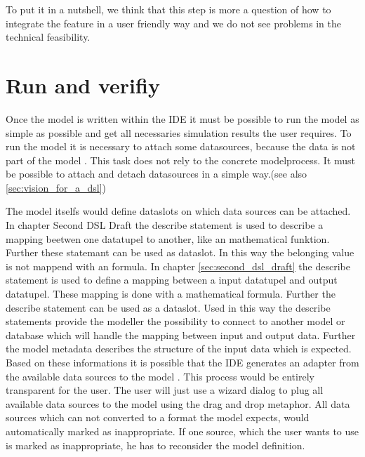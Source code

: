 To put it in a nutshell, we think that this step is more a question of how to integrate the feature in a user friendly way and we do not see problems in the technical feasibility.

\section{Run and verifiy}
Once the model is written within the IDE it must be possible to run the model as simple as possible and get all necessaries simulation results the user requires. To run the model it is necessary to attach some datasources, because the data is not part of the model \autocite{dsl:muetzelfeldt}. This task does not rely to the concrete modelprocess. It must be possible to attach and detach datasources in a simple way.(see also \ref{sec:vision_for_a_dsl})


The model itselfs would define dataslots on which data sources can be attached. In chapter Second DSL Draft the describe statement is used to describe a mapping beetwen one datatupel to another, like an mathematical funktion. Further these statemant can be used as dataslot. In this way the belonging value is not mappend with an formula. In chapter \ref{sec:second_dsl_draft} the describe statement is used to define a mapping between a input datatupel and output datatupel. These mapping is done with a mathematical formula. Further the describe statement can be used as a dataslot. Used in this way the describe statements provide the modeller the possibility to connect to another model or database which will handle the mapping between input and output data. Further the model metadata describes the structure of the input data which is expected. Based on these informations it is possible that the IDE generates an adapter from the available data sources to the model \autocite[81]{Villa2009577}. This process would be entirely transparent for the user. The user will just use a wizard dialog to plug all available data sources to the model using the drag and drop metaphor. All data sources which can not converted to a format the model expects, would automatically marked as inappropriate. If one source, which the user wants to use is marked as inappropriate, he has to reconsider the model definition.


